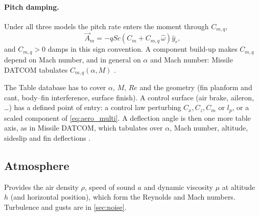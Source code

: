 
\paragraph{Pitch damping.} Under all three models the pitch rate enters the moment through
$C_{m,q}$,
\begin{equation} \label{eq:pitch_damping_moment}
    \vec{A}_m = -qSc\left(C_m + C_{m,q}\,\hat{\omega}\right)\hat{y}_r,
\end{equation}
and $C_{m,q}>0$ damps in this sign convention. A component build-up makes $C_{m,q}$ depend on
Mach number, and in general on $\alpha$ and Mach number: Missile DATCOM tabulates
$C_{m,q}(\alpha,M)$ \cite{datcom}.

The Table database has to cover $\alpha$, $M$, $Re$ and the geometry (fin planform and cant,
body--fin interference, surface finish).
A control surface (air brake, aileron, \dots) has a defined point of entry: a control law
perturbing $C_x,C_z,C_m$ or $l_p$, or a scaled component of \autoref{eq:aero_multi}.
A deflection angle is then one more table axis, as in Missile DATCOM, which tabulates over $\alpha$,
Mach number, altitude, sideslip and fin deflections \cite{datcom}.


\subsection{Atmosphere}\label{sec:atmosphere}
Provides the air density $\rho$, speed of sound $a$ and dynamic viscosity $\mu$ at altitude $h$
(and horizontal position), which form the Reynolds and Mach numbers. Turbulence and gusts are in
\autoref{sec:noise}.

